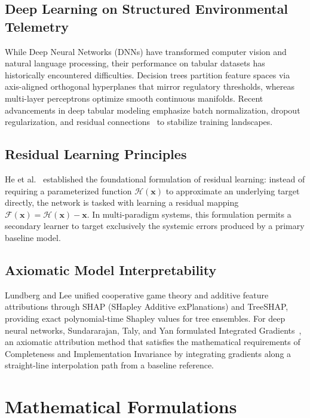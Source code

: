 \documentclass[conference]{IEEEtran}
\begin{document}
\subsection{Deep Learning on Structured Environmental Telemetry}
While Deep Neural Networks (DNNs) have transformed computer vision and natural language processing, their performance on tabular datasets has historically encountered difficulties. Decision trees partition feature spaces via axis-aligned orthogonal hyperplanes that mirror regulatory thresholds, whereas multi-layer perceptrons optimize smooth continuous manifolds. Recent advancements in deep tabular modeling emphasize batch normalization, dropout regularization, and residual connections~\cite{he2016deep} to stabilize training landscapes.

\subsection{Residual Learning Principles}
He et al.~\cite{he2016deep} established the foundational formulation of residual learning: instead of requiring a parameterized function $\mathcal{H}(\mathbf{x})$ to approximate an underlying target directly, the network is tasked with learning a residual mapping $\mathcal{F}(\mathbf{x}) = \mathcal{H}(\mathbf{x}) - \mathbf{x}$. In multi-paradigm systems, this formulation permits a secondary learner to target exclusively the systemic errors produced by a primary baseline model.

\subsection{Axiomatic Model Interpretability}
Lundberg and Lee unified cooperative game theory and additive feature attributions through SHAP (SHapley Additive exPlanations) and TreeSHAP, providing exact polynomial-time Shapley values for tree ensembles. For deep neural networks, Sundararajan, Taly, and Yan formulated Integrated Gradients~\cite{sundararajan2017axiomatic}, an axiomatic attribution method that satisfies the mathematical requirements of Completeness and Implementation Invariance by integrating gradients along a straight-line interpolation path from a baseline reference.

\section{Mathematical Formulations}
\label{sec:math}
\end{document}
